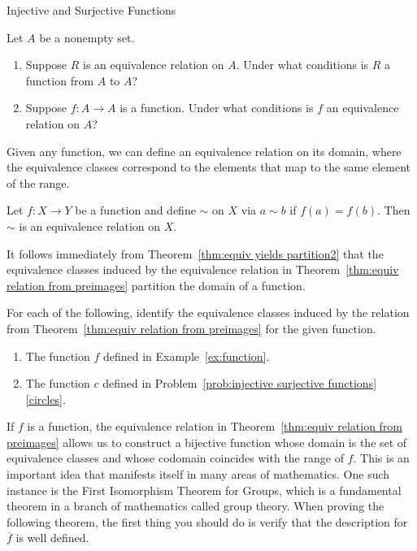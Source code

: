 \begin{section}{Injective and Surjective Functions}
\begin{problem}
Let $A$ be a nonempty set.
\begin{enumerate}[label=\textrm{(\alph*)}]
\item Suppose $R$ is an equivalence relation on $A$. Under what conditions is $R$ a function from $A$ to $A$?
\item Suppose $f:A\to A$ is a function. Under what conditions is $f$ an equivalence relation on $A$?
\end{enumerate}
\end{problem}

Given any function, we can define an equivalence relation on its domain, where the equivalence classes correspond to the elements that map to the same element of the range.

\begin{theorem}\label{thm:equiv relation from preimages}
Let $f:X\to Y$ be a function and define $\sim$ on $X$ via $a\sim b$ if $f(a) = f(b)$. Then $\sim$ is an equivalence relation on $X$.
\end{theorem}

It follows immediately from Theorem~\ref{thm:equiv yields partition2} that the equivalence classes induced by the equivalence relation in Theorem~\ref{thm:equiv relation from preimages} partition the domain of a function.

\begin{problem}\label{prob:equiv classes from preimages}
For each of the following, identify the equivalence classes induced by the relation from Theorem~\ref{thm:equiv relation from preimages} for the given function.
\begin{enumerate}[label=\textrm{(\alph*)}]
\item The function $f$ defined in Example~\ref{ex:function}.
\item The function $c$ defined in Problem~\ref{prob:injective surjective functions}\ref{circles}.
\end{enumerate}
\end{problem}

If $f$ is a function, the equivalence relation in Theorem~\ref{thm:equiv relation from preimages} allows us to construct a bijective function whose domain is the set of equivalence classes and whose codomain coincides with the range of $f$.  This is an important idea that manifests itself in many areas of mathematics.  One such instance is the First Isomorphism Theorem for Groups, which is a fundamental theorem in a branch of mathematics called group theory.  When proving the following theorem, the first thing you should do is verify that the description for $\overline{f}$ is well defined.


\end{section}
